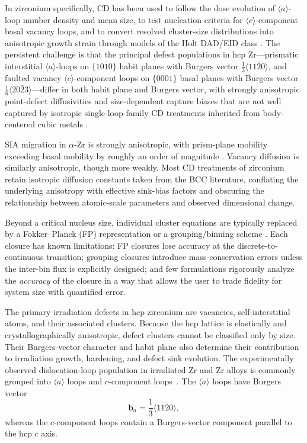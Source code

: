 In zirconium specifically, CD has been used to follow the dose
evolution of $\langle a\rangle$-loop number density and mean size, to
test nucleation criteria for $\langle c\rangle$-component basal
vacancy loops, and to convert resolved cluster-size distributions
into anisotropic growth strain through models of the Holt
DAD/EID class \citep{Holt1988,HoltCausey1993,Christensen2015}.
The persistent challenge is that the principal defect populations in
hcp Zr—prismatic interstitial $\langle a\rangle$-loops on
$\{10\bar{1}0\}$ habit planes with Burgers vector
$\tfrac{1}{3}\langle 11\bar{2}0\rangle$, and faulted vacancy
$\langle c\rangle$-component loops on $\{0001\}$ basal planes with
Burgers vector $\tfrac{1}{6}\langle 20\bar{2}3\rangle$—differ in
both habit plane and Burgers vector, with strongly anisotropic
point-defect diffusivities and size-dependent capture biases that are
not well captured by isotropic single-loop-family CD treatments
inherited from body-centered cubic metals
\citep{Carpenter1988,Yi2013,Onimus2004}.


SIA migration in $\alpha$-Zr is strongly anisotropic, with prism-plane
mobility exceeding basal mobility by roughly an order of magnitude
\citep{Christensen2015,PatraTrinkle2019}. Vacancy diffusion is
similarly anisotropic, though more weakly. Most CD treatments of
zirconium retain isotropic diffusion constants taken from the BCC
literature, conflating the underlying anisotropy with effective
sink-bias factors and obscuring the relationship between atomic-scale
parameters and observed dimensional change.

Beyond a critical nucleus size, individual cluster equations are
typically replaced by a Fokker–Planck (FP) representation
\citep{Wagner1981,Russell1984} or a grouping/binning scheme
\citep{GolubovSingh2001,KohnertWirth2017}. Each closure has known
limitations: FP closures lose accuracy at the discrete-to-continuous
transition; grouping closures introduce mass-conservation errors
unless the inter-bin flux is explicitly designed; and few
formulations rigorously analyze the \emph{accuracy} of the closure in
a way that allows the user to trade fidelity for system size with
quantified error.

The primary irradiation defects in hcp zirconium are vacancies, self-interstitial
atoms, and their associated clusters.  Because the hcp lattice is elastically
and crystallographically anisotropic, defect clusters cannot be classified only
by size.  Their Burgers-vector character and habit plane also determine their
contribution to irradiation growth, hardening, and defect sink evolution.
The experimentally observed dislocation-loop population in irradiated Zr and
Zr alloys is commonly grouped into $\langle a\rangle$ loops and
$c$-component loops~\citep{Kelly1973,ChoiKim2013,Tournadre2012}.
The $\langle a\rangle$ loops have Burgers vector
\begin{equation}
  \mathbf{b}_a =
  \frac{1}{3}\langle 11\bar{2}0\rangle ,
\end{equation}
whereas the $c$-component loops contain a Burgers-vector component parallel
to the hcp $c$ axis.

